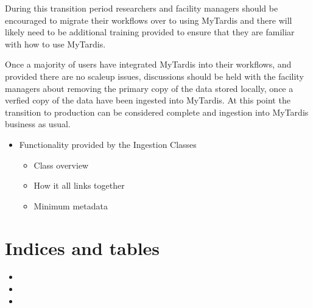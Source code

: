 \documentclass[letterpaper,10pt,english]{sphinxmanual}
\begin{document}
\sphinxAtStartPar
During this transition period researchers and facility managers should be encouraged to migrate their workflows over to using MyTardis and there will likely need to be additional training provided to ensure that they are familiar with how to use MyTardis.

\sphinxAtStartPar
Once a majority of users have integrated MyTardis into their workflows, and provided there are no scale\sphinxhyphen{}up issues, discussions should be held with the facility managers about removing the primary copy of the data stored locally, once a verfied copy of the data have been ingested into MyTardis. At this point the transition to production can be considered complete and ingestion into MyTardis business as usual.
\begin{itemize}
\item {} 
\sphinxAtStartPar
Functionality provided by the Ingestion Classes
\begin{itemize}
\item {} 
\sphinxAtStartPar
Class overview

\item {} 
\sphinxAtStartPar
How it all links together

\item {} 
\sphinxAtStartPar
Minimum metadata

\end{itemize}

\end{itemize}


\chapter{Indices and tables}
\label{\detokenize{index:indices-and-tables}}\begin{itemize}
\item {} 
\sphinxAtStartPar
{}

\item {} 
\sphinxAtStartPar
{}

\item {} 
\sphinxAtStartPar
{}

\end{itemize}



\renewcommand{\indexname}{Index}
\printindex
\end{document}
